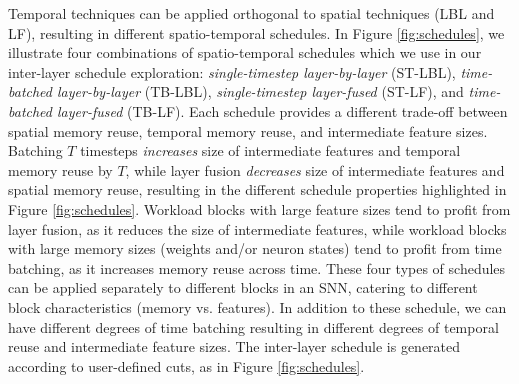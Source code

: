 Temporal techniques can be applied orthogonal to spatial techniques (LBL and LF), resulting in different spatio-temporal schedules. In Figure \ref{fig:schedules}, we illustrate four combinations of spatio-temporal schedules which we use in our inter-layer schedule exploration: \textit{single-timestep layer-by-layer} (ST-LBL), \textit{time-batched layer-by-layer} (TB-LBL), \textit{single-timestep layer-fused} (ST-LF), and \textit{time-batched layer-fused} (TB-LF). Each schedule provides a different trade-off between spatial memory reuse, temporal memory reuse, and intermediate feature sizes. Batching $T$ timesteps \textit{increases} size of intermediate features and temporal memory reuse by $T$, while layer fusion \textit{decreases} size of intermediate features and spatial memory reuse, resulting in the different schedule properties highlighted in Figure \ref{fig:schedules}. Workload blocks with large feature sizes tend to profit from layer fusion, as it reduces the size of intermediate features, while workload blocks with large memory sizes (weights and/or neuron states) tend to profit from time batching, as it increases memory reuse across time. These four types of schedules can be applied separately to different blocks in an SNN, catering to different block characteristics (memory vs. features). In addition to these schedule, we can have different degrees of time batching resulting in different degrees of temporal reuse and intermediate feature sizes. The inter-layer schedule is generated according to user-defined cuts, as in Figure \ref{fig:schedules}.






